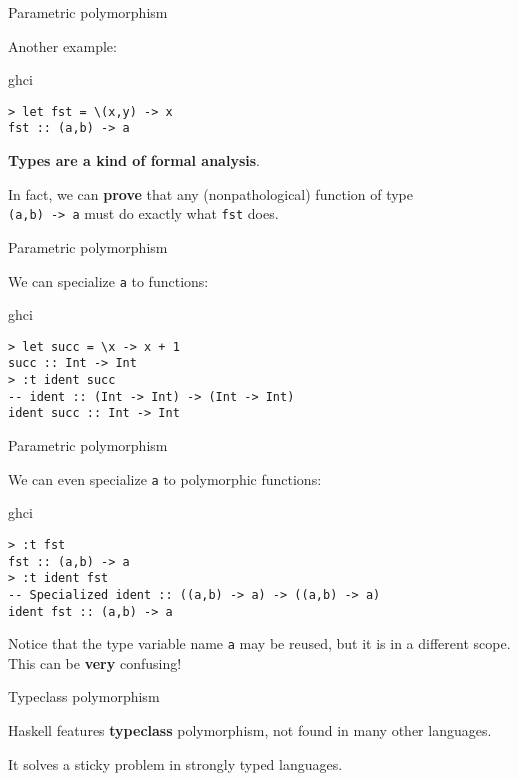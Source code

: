 %
\begin{frame}[fragile]{Parametric polymorphism}

Another example:

\begin{block}{ghci}
\begin{verbatim}
> let fst = \(x,y) -> x
fst :: (a,b) -> a
\end{verbatim}
\end{block}

\textbf{Types are a kind of formal analysis}. 

In fact, we can \textbf{prove} that any (nonpathological) function of type\\
\texttt{(a,b) -> a} must do exactly what \texttt{fst} does.

\end{frame}

%
\begin{frame}[fragile]{Parametric polymorphism}

We can specialize \texttt{a} to functions:

\begin{block}{ghci}
\begin{verbatim}
> let succ = \x -> x + 1
succ :: Int -> Int
> :t ident succ
-- ident :: (Int -> Int) -> (Int -> Int)
ident succ :: Int -> Int
\end{verbatim}
\end{block}

\end{frame}

%
\begin{frame}[fragile]{Parametric polymorphism}

We can even specialize \texttt{a} to polymorphic functions:

\begin{block}{ghci}
\begin{verbatim}
> :t fst
fst :: (a,b) -> a
> :t ident fst
-- Specialized ident :: ((a,b) -> a) -> ((a,b) -> a)
ident fst :: (a,b) -> a
\end{verbatim}
\end{block}

Notice that the type variable name \texttt{a} may be reused, but it is in a
different scope. This can be \textbf{very} confusing!

\end{frame}

%
\begin{frame}[fragile]{Typeclass polymorphism}

Haskell features \textbf{typeclass} polymorphism, not found in many other
languages.

It solves a sticky problem in strongly typed languages.

\end{frame}

